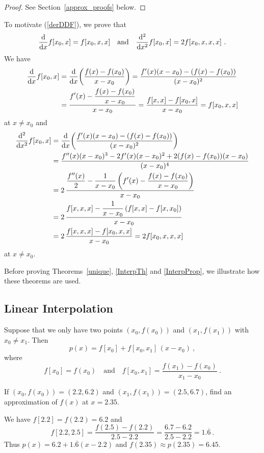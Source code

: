 \begin{proof}
See Section~\ref{approx_proofs} below.
\end{proof}

To motivate (\ref{derDDF}), we prove that
\[
\dfdx{f[x_0,x]}{x} = f[x_0,x,x] \quad \text{and} \quad
\dfdxn{f[x_0,x]}{x}{2} = 2 f[x_0,x,x,x] \ .
\]
We have
\begin{align*}
\dfdx{f[x_0,x]}{x} &= \dfdx{\left(\frac{f(x)-f(x_0)}{x-x_0}\right)}{x}
= \frac{f'(x) (x-x_0) - ( f(x)- f(x_0) )}{(x-x_0)^2} \\
&= \frac{\displaystyle  f'(x) - \frac{f(x)-f(x_0)}{x-x_0}}{x-x_0}
= \frac{f[x,x] - f[x_0,x]}{x-x_0} = f[x_0,x,x]
\end{align*}
at $x\neq x_0$ and
\begin{align*}
\dfdxn{f[x_0,x]}{x}{2} &= \dfdx{\left(
\frac{f'(x) (x-x_0) - ( f(x)- f(x_0) )}{(x-x_0)^2}\right)}{x} \\
&= \frac{f''(x)(x-x_0)^3 - 2 f'(x) (x-x_0)^2 +  2(f(x)- f(x_0))(x-x_0)}
{(x-x_0)^4}\\
&= 2\, \frac{\displaystyle \frac{f''(x)}{2} -
\frac{1}{x-x_0}\left(f'(x) - \frac{f(x)- f(x_0)}{x-x_0}\right)}{x-x_0}\\
&= 2\, \frac{\displaystyle f[x,x,x] -
\frac{1}{x-x_0}\left(f[x,x] - f[x,x_0]\right)}{x-x_0}\\
&= 2\, \frac{f[x,x,x] - f[x_0,x,x]}{x-x_0} = 2 f[x_0,x,x,x]
\end{align*}
at $x \neq x_0$.

Before proving Theorems~\ref{unique}, \ref{InterpTh} and
\ref{InterpProp}, we illustrate how these theorems are used.

\subsection{Linear Interpolation}

Suppose that we only have two points $(x_0,f(x_0))$ and $(x_1,f(x_1))$
with $x_0\neq x_1$.  Then
\[
p(x)=f[x_0]+f[x_0,x_1]\,(x-x_0) \ ,
\]
where
\[
f[x_0]  = f(x_0)
\quad \text{and} \quad
f[x_0,x_1] =\frac{f(x_1)-f(x_0)}{x_1-x_0} \ .
\]

\begin{egg}
If $(x_0,f(x_0))= (2.2,6.2)$ and $(x_1,f(x_1)) = (2.5,6.7)$, find an
approximation of $f(x)$ at $x = 2.35$.

We have $f[2.2]= f(2.2) = 6.2$ and 
\[
f[2.2,2.5]=\frac{f(2.5)-f(2.2)}{2.5-2.2}
=\frac{6.7-6.2}{2.5-2.2}=1.\overline{6} \ .
\]
Thus $p(x)=6.2+1.\overline{6}(x-2.2)$ and
$f(2.35) \approx p(2.35) = 6.45$.
\end{egg}

